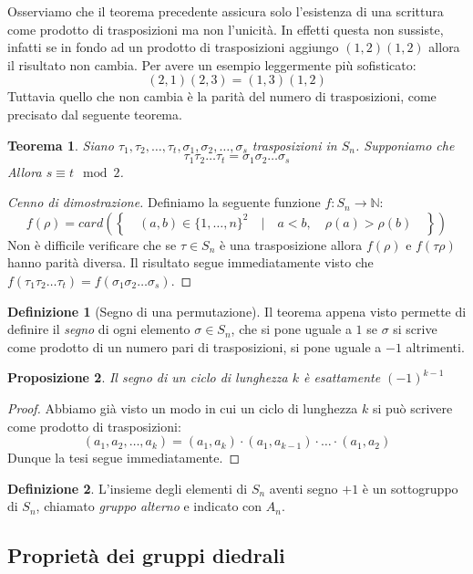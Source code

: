\documentclass[11pt]{article}
\theoremstyle{plain}
\newtheorem{thm}{Teorema}[section]
\newtheorem{prop}[thm]{Proposizione}
\theoremstyle{definition}
\newtheorem{defn}{Definizione}[section]
\theoremstyle{remark}
\newcommand{\N}{\mathbb{N}}
\begin{document}
Osserviamo che il teorema precedente assicura solo l'esistenza di una scrittura come prodotto di trasposizioni
ma non l'unicità. In effetti questa non sussiste, infatti se in fondo ad un prodotto di trasposizioni aggiungo $(1,2)(1,2)$
allora il risultato non cambia. Per avere un esempio leggermente più sofisticato:
\[(2,1)(2,3) = (1,3)(1,2)\]
Tuttavia quello che non cambia è la parità del numero di trasposizioni, come precisato dal seguente teorema.
\begin{thm}
Siano $\tau_1, \tau_2, \dots, \tau_t, \sigma_1, \sigma_2, \dots, \sigma_s$ trasposizioni in $S_n$. Supponiamo che
\[\tau_1\tau_2\dots\tau_t = \sigma_1\sigma_2\dots\sigma_s\]
Allora $s\equiv t \mod 2$.
\end{thm}
\begin{proof}[Cenno di dimostrazione]
Definiamo la seguente funzione $f:S_n\to\N$:
\[f(\rho) = card\left(\left\{\quad(a,b)\in\{1,\dots,n\}^2 \quad | \quad a < b, \quad\rho(a) > \rho(b) \quad\right\}\right)\]
Non è difficile verificare che se $\tau\in S_n$ è una trasposizione allora $f(\rho)$ e $f(\tau\rho)$ hanno parità diversa.
Il risultato segue immediatamente visto che $f(\tau_1\tau_2\dots\tau_t) = f(\sigma_1\sigma_2\dots\sigma_s)$.
\end{proof}

\begin{defn}[Segno di una permutazione]
Il teorema appena visto permette di definire il \emph{segno} di ogni elemento $\sigma\in S_n$, che si pone uguale a $1$
se $\sigma$ si scrive come prodotto di un numero pari di trasposizioni, si pone uguale a $-1$ altrimenti.
\end{defn}

\begin{prop}
Il segno di un ciclo di lunghezza $k$ è esattamente $(-1)^{k-1}$
\end{prop}
\begin{proof}
Abbiamo già visto un modo in cui un ciclo di lunghezza $k$ si può scrivere come prodotto di trasposizioni:
\[(a_1, a_2, \dots, a_k) = (a_1, a_k)\cdot (a_1, a_{k-1}) \cdot \dots \cdot (a_1, a_2)\]
Dunque la tesi segue immediatamente.
\end{proof}

\begin{defn}
L'insieme degli elementi di $S_n$ aventi segno $+1$ è un sottogruppo di $S_n$,
chiamato \emph{gruppo alterno} e indicato con $A_n$.
\end{defn}


\subsection{Proprietà dei gruppi diedrali}
\end{document}
